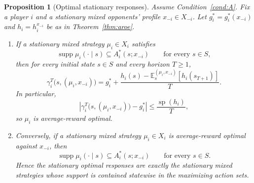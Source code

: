 \documentclass[11pt]{article}
\newtheorem{proposition}[theorem]{Proposition}
\theoremstyle{definition}
\newcommand{\E}{\mathbb{E}}
\newcommand{\1}{\mathbf{1}}
\DeclareMathOperator{\spn}{sp}
\DeclareMathOperator{\supp}{supp}
\begin{document}
\begin{proposition}[Optimal stationary responses]\label{prop:optimal-stationary}
Assume Condition~\ref{cond:A}. Fix a player $i$ and a stationary mixed opponents' profile $x_{-i}\in X_{-i}$. Let $g_i^*=g_i^*(x_{-i})$ and $h_i=h_i^{x_{-i}}$ be as in Theorem~\ref{thm:aroe}.

\begin{enumerate}[label=\textup{(\alph*)},leftmargin=2.4em]
\item If a stationary mixed strategy $\mu_i\in X_i$ satisfies
\[
\supp \mu_i(\cdot\mid s)\subseteq A_i^*(s;x_{-i})\qquad\text{for every }s\in S,
\]
then for every initial state $s\in S$ and every horizon $T\ge1$,
\begin{equation}\label{eq:exact-identity}
\gamma_i^T\bigl(s,(\mu_i,x_{-i})\bigr)
= g_i^*+\frac{h_i(s)-\E_s^{(\mu_i,x_{-i})}[h_i(s_{T+1})]}{T}.
\end{equation}
In particular,
\begin{equation}\label{eq:exact-lower-bound}
\left|\gamma_i^T\bigl(s,(\mu_i,x_{-i})\bigr)-g_i^*\right|\le \frac{\spn(h_i)}{T},
\end{equation}
so $\mu_i$ is average-reward optimal.

\item Conversely, if a stationary mixed strategy $\mu_i\in X_i$ is average-reward optimal against $x_{-i}$, then
\[
\supp \mu_i(\cdot\mid s)\subseteq A_i^*(s;x_{-i})\qquad\text{for every }s\in S.
\]
Hence the stationary optimal responses are exactly the stationary mixed strategies whose support is contained statewise in the maximizing action sets.
\end{enumerate}
\end{proposition}
\end{document}
